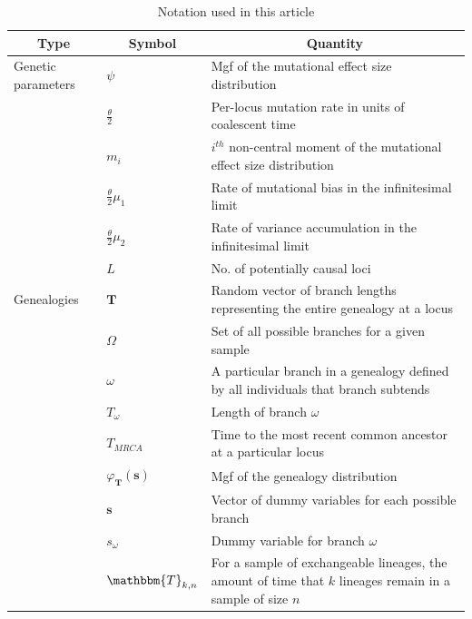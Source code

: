 \begin{table}
  \caption{Notation used in this article}
  \centering
  \begin{tabular}{l l l}
    \hline
    \multicolumn{1}{c}{Type} &\multicolumn{1}{c}{Symbol} & \multicolumn{1}{c}{Quantity} \\
    \hline
    Genetic parameters & $\psi$ & \multicolumn{1}{p{10cm}}{Mgf of the mutational effect size distribution }\\
                             & $\frac{\theta}{2}$ & \multicolumn{1}{p{10cm}}{Per-locus mutation rate in units of coalescent time}\\
                             & $m_i$ &  \multicolumn{1}{p{10cm}}{$i^{th}$ non-central moment of the mutational effect size distribution}\\
                             & $\frac{\theta}{2}\mu_1$ & \multicolumn{1}{p{10cm}}{Rate of mutational bias in the infinitesimal limit}\\
                             & $\frac{\theta}{2}\mu_2$ & \multicolumn{1}{p{10cm}}{Rate of variance accumulation in the infinitesimal limit}\\
                             & $L$ & \multicolumn{1}{p{10cm}}{No. of potentially causal loci}\\
    Genealogies & $\mathbf{T}$ & \multicolumn{1}{p{10cm}}{Random vector of branch lengths representing the entire genealogy at a locus}\\
                             & $\Omega$ & \multicolumn{1}{p{10cm}}{Set of all possible branches for a given sample}\\
                             & $\omega$ & \multicolumn{1}{p{10cm}}{A particular branch in a genealogy defined by all individuals that branch subtends}\\
                             & $T_\omega$ & \multicolumn{1}{p{10cm}}{Length of branch $\omega$} \\
                             & $T_{MRCA}$ & \multicolumn{1}{p{10cm}}{Time to the most recent common ancestor at a particular locus}\\
                             & $\varphi_{\mathbf{T}}(\mathbf{s})$ & Mgf of the genealogy distribution \\
                             & $\mathbf{s}$ & Vector of dummy variables for each possible branch\\
                             & $s_\omega$ & Dummy variable for branch $\omega$ \\
                             & $\mathbbm{T}_{k,n}$ & \multicolumn{1}{p{10cm}}{For a sample of exchangeable lineages, the amount of time that $k$ lineages remain in a sample of size $n$}\\

\end{tabular}
\end{table}
